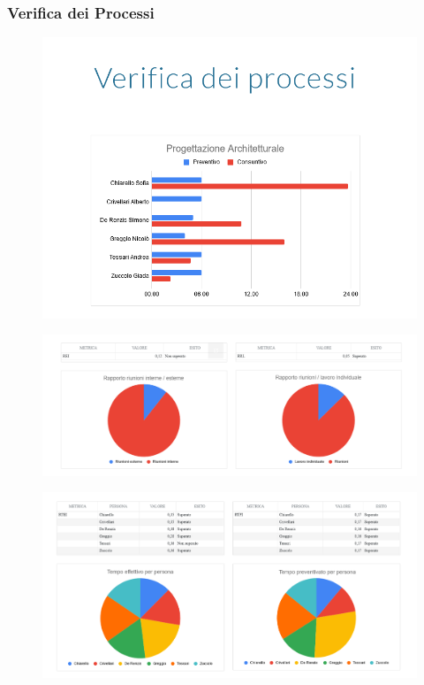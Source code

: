 \subsubsection{Verifica dei Processi}
\begin{figure}[h]
	\centering
	\includegraphics[scale=0.6]{res/images/cruscotto/pa_1.png}
\end{figure}
\begin{figure}[H]
	\includegraphics[scale=0.5]{res/images/cruscotto/pa_2.png}
\end{figure}
\begin{figure}[H]
	\includegraphics[scale=0.5]{res/images/cruscotto/pa_3.png}
\end{figure}
